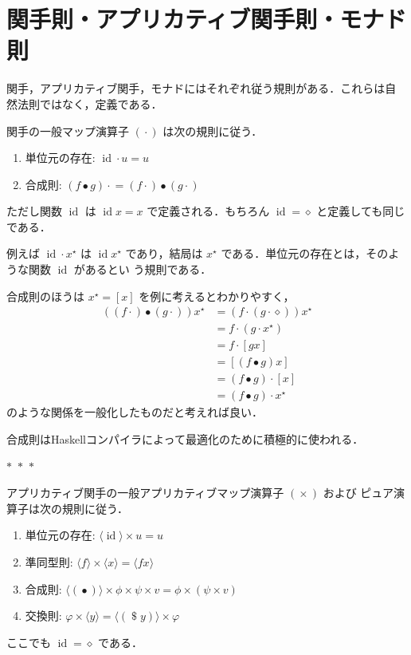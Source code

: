 \documentclass[a5paper,twoside,fleqn,draft]{jsbook}
\newcommand{\separator}{\begin{center}$*$~$*$~$*$\end{center}}
\newcommand{\programminglanguage}[1]{\textsf{#1}}
\newcommand{\haskell}{\programminglanguage{Haskell}}
\newcommand{\mAnonParam}{\diamond}
\newcommand{\mSpecialFunc}[1]{#1}
\DeclareMathOperator{\mId}{\mSpecialFunc{id}}
\DeclareMathOperator{\mApply}{\$}
\DeclareMathOperator{\mAppMap}{\times}
\DeclareMathOperator{\mComp}{\bullet}
\DeclareMathOperator{\mMap}{\cdot}
\newcommand{\mPureWith}[1]{\langle#1\rangle}
\newcommand{\mList}[1]{{#1}^\mathrm{\star}}
\begin{document}
\section{関手則・アプリカティブ関手則・モナド則}

関手，アプリカティブ関手，モナドにはそれぞれ従う規則がある．これらは自
然法則ではなく，定義である．

関手の一般マップ演算子 $(\mMap)$ は次の規則に従う．
\begin{enumerate}
\item 単位元の存在: $\mId\mMap u=u$
\item 合成則: $(f\mComp g)\mMap=(f\mMap)\mComp{}(g\mMap)$%
\end{enumerate}
ただし関数 $\mId$ は $\mId x=x$ で定義される．もちろん
$\mId=\mAnonParam$ と定義しても同じである．


例えば $\mId\mMap\mList{x}$ は $\mId\mList{x}$ であり，結局は
$\mList{x}$ である．単位元の存在とは，そのような関数 $\mId$ があるとい
う規則である．

合成則のほうは $\mList{x}=[x]$ を例に考えるとわかりやすく，
\begin{align}
  ((f\mMap)\mComp(g\mMap))\mList{x}
  &=(f\mMap{}(g\mMap\mAnonParam))\mList{x}\\
  &=f\mMap{}(g\mMap\mList{x})\\
  &=f\mMap{}[gx]\\
  &=[(f\mComp g)x]\\
  &=(f\mComp g)\mMap{}[x]\\
  &=(f\mComp g)\mMap\mList{x}
\end{align}
のような関係を一般化したものだと考えれば良い．

合成則は\haskell コンパイラによって最適化のために積極的に使われる．

\separator

アプリカティブ関手の一般アプリカティブマップ演算子 $(\mAppMap)$ および
ピュア演算子は次の規則に従う．
\begin{enumerate}
\item 単位元の存在: $\mPureWith{\mId}\mAppMap u=u$
\item 準同型則: $\mPureWith{f}\mAppMap\mPureWith{x}=\mPureWith{fx}$
\item 合成則: $\mPureWith{(\mComp)}\mAppMap\phi\mAppMap\psi\mAppMap v=\phi\mAppMap{}(\psi\mAppMap v)$
\item 交換則: $\varphi\mAppMap\mPureWith{y}=\mPureWith{(\mApply y)}\mAppMap\varphi$
\end{enumerate}
ここでも $\mId=\mAnonParam$ である．
\end{document}
